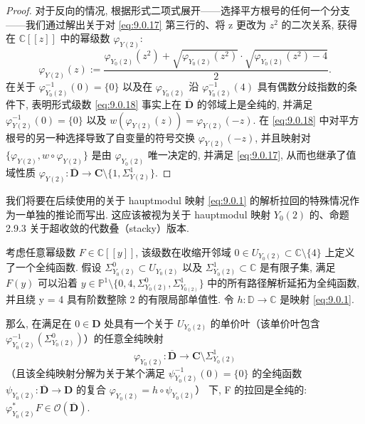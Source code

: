 \begin{proof}
对于反向的情况, 根据形式二项式展开——选择平方根号的任何一个分支——我们通过解出关于对 \eqref{eq:9.0.17} 第三行的、将 z 更改为 \(z^2\) 的二次关系, 
获得在 \(\mathbb{C}[\![z]\!]\) 中的幂级数 \(\varphi_{Y(2)}\):
\begin{equation}\label{eq:9.0.18}
\varphi_{Y(2)}(z) := \frac{\varphi_{Y_0(2)}(z^2) + \sqrt{\varphi_{Y_0(2)}(z^2)} \cdot \sqrt{\varphi_{Y_0(2)}(z^2) - 4}}{2}.
\end{equation}
在关于 \(\varphi_{Y_0(2)}^{-1}(0) = \{0\}\) 以及在 \(\varphi_{Y_0(2)}\) 沿 \(\varphi_{Y_0(2)}^{-1}(4)\) 具有偶数分歧指数的条件下, 
表明形式级数 \eqref{eq:9.0.18} 事实上在 \(\overline{\mathbf{D}}\) 的邻域上是全纯的, 
并满足 \(\varphi_{Y(2)}^{-1}(0) = \{0\}\) 以及 \(w\left(\varphi_{Y(2)}(z)\right) = \varphi_{Y(2)}(-z)\). 
在 \eqref{eq:9.0.18} 中对平方根号的另一种选择导致了自变量的符号交换 \(\varphi_{Y(2)}(-z)\), 
并且映射对 \(\{\varphi_{Y(2)}, w \circ \varphi_{Y(2)}\}\) 是由 \(\varphi_{Y_0(2)}\) 唯一决定的, 
并满足 \eqref{eq:9.0.17}, 
从而也继承了值域性质 \(\varphi_{Y(2)}: \overline{\mathbf{D}} \to \mathbf{C} \setminus \{1, \Sigma_{Y(2)}^1\}\).
\end{proof}

我们将要在后续使用的关于 hauptmodul 映射 \eqref{eq:9.0.1} 的解析拉回的特殊情况作为一单独的推论而写出. 
这应该被视为关于 hauptmodul 映射 \(Y_0(2)\) 的、命题 2.9.3 关于超收敛的代数叠（stacky）版本.

\begin{corollary}\label{cor:9.0.19}
考虑任意幂级数 \(F \in \mathbb{C}[\![y]\!]\), 
该级数在收缩开邻域 \(0 \in U_{Y_0(2)} \subset \mathbb{C} \setminus \{4\}\) 上定义了一个全纯函数. 
假设 \(\Sigma^0_{Y_0(2)} \subset U_{Y_0(2)}\) 以及 \(\Sigma^1_{Y_0(2)} \subset \mathbb{C}\) 是有限子集, 
满足 \(F(y)\) 可以沿着 \(y \in \mathbb{P}^1 \setminus \{0,4,\Sigma^0_{Y_0(2)},\Sigma^1_{Y_{0(2)}}\}\) 
中的所有路径解析延拓为全纯函数, 
并且绕 y = 4 具有阶数整除 2 的有限局部单值性. 
令 \(h: \mathbb{D} \to \mathbb{C}\) 是映射 \eqref{eq:9.0.1}.

那么, 在满足在 \(0 \in \mathbf{D}\) 处具有一个关于 \(U_{Y_0(2)}\) 的单价叶（该单价叶包含 \(\varphi_{Y_0(2)}^{-1}\left(\Sigma^0_{Y_0(2)}\right)\)）的任意全纯映射
\[ \varphi_{Y_0(2)}: \overline{\mathbf{D}} \to \mathbf{C} \setminus \Sigma^1_{Y_0(2)} \]
（且该全纯映射分解为关于某个满足 \(\psi^{-1}_{Y_0(2)}(0) = \{0\}\) 的全纯函数 \(\psi_{Y_0(2)}: \overline{\mathbf{D}} \to \mathbf{D}\) 的复合 \(\varphi_{Y_0(2)} = h \circ \psi_{Y_0(2)}\)）
下, F 的拉回是全纯的: \(\varphi^*_{Y_0(2)}F \in \mathcal{O}(\overline{\mathbf{D}})\).
\end{corollary}

